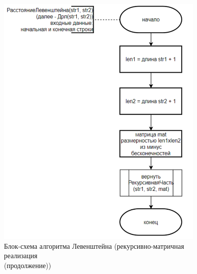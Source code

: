 \begin{figure}[H]
    \centering
    \includegraphics[width=0.9\textwidth]{img/block_1_3_2.png}
    \caption{Блок-схема алгоритма Левенштейна (рекурсивно-матричная реализация\\(продолжение))}
\end{figure}

